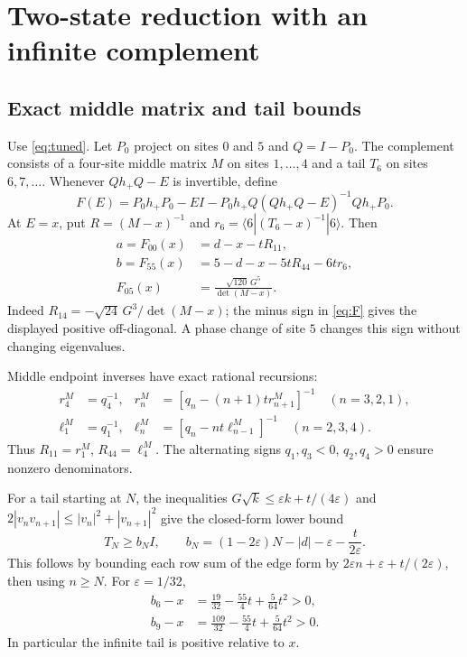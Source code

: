 \documentclass[11pt]{article}
\begin{document}
\section{Two-state reduction with an infinite complement}
\subsection{Exact middle matrix and tail bounds}
Use \eqref{eq:tuned}. Let $P_0$ project on sites $0$ and $5$ and $Q=I-P_0$. The complement consists of a four-site middle matrix $M$ on sites $1,\ldots,4$ and a tail $T_6$ on sites $6,7,\ldots$. Whenever $Qh_+Q-E$ is invertible, define
\begin{equation}\label{eq:F}
F(E)=P_0h_+P_0-EI
-P_0h_+Q(Qh_+Q-E)^{-1}Qh_+P_0 .
\end{equation}
At $E=x$, put $R=(M-x)^{-1}$ and
$r_6=\langle6|(T_6-x)^{-1}|6\rangle$. Then
\begin{align}
a=F_{00}(x)&=d-x-tR_{11},\nonumber\\
b=F_{55}(x)&=5-d-x-5tR_{44}-6tr_6,\label{eq:Fab}\\
F_{05}(x)&=\frac{\sqrt{120}\,G^5}{\det(M-x)}.\nonumber
\end{align}
Indeed $R_{14}=-\sqrt{24}\,G^3/\det(M-x)$; the minus sign in \eqref{eq:F} gives the displayed positive off-diagonal. A phase change of site $5$ changes this sign without changing eigenvalues.

Middle endpoint inverses have exact rational recursions:
\begin{align*}
r_4^{M}&=q_4^{-1},&
r_n^{M}&=[q_n-(n+1)tr_{n+1}^{M}]^{-1}\quad(n=3,2,1),\\
\ell_1^{M}&=q_1^{-1},&
\ell_n^{M}&=[q_n-nt\ell_{n-1}^{M}]^{-1}\quad(n=2,3,4).
\end{align*}
Thus $R_{11}=r_1^M$, $R_{44}=\ell_4^M$. The alternating signs $q_1,q_3<0$, $q_2,q_4>0$ ensure nonzero denominators.

For a tail starting at $N$, the inequalities
$G\sqrt{k}\leq\varepsilon k+t/(4\varepsilon)$ and
$2|v_nv_{n+1}|\leq |v_n|^2+|v_{n+1}|^2$ give the closed-form lower bound
\begin{equation}\label{eq:tail}
T_N\geq b_N I,\qquad
b_N=(1-2\varepsilon)N-|d|-\varepsilon-\frac{t}{2\varepsilon}.
\end{equation}
This follows by bounding each row sum of the edge form by
$2\varepsilon n+\varepsilon+t/(2\varepsilon)$, then using $n\geq N$.
For $\varepsilon=1/32$,
\begin{align}
b_6-x&=\frac{19}{32}-\frac{55}4t+\frac5{64}t^2>0,\nonumber\\
b_9-x&=\frac{109}{32}-\frac{55}4t+\frac5{64}t^2>0.\label{eq:b69}
\end{align}
In particular the infinite tail is positive relative to $x$.
\end{document}
